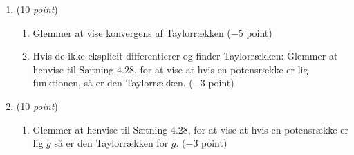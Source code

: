 \documentclass{article}
\begin{document}
\begin{opg}\hfill
	\begin{enumerate}
		\item (10 \emph{point})\begin{enumerate}[label=(\roman*)]
			\item Glemmer at vise konvergens af Taylorrækken ($ -5 $ point)
			\item Hvis de ikke eksplicit differentierer og finder Taylorrækken: Glemmer at henvise til Sætning 4.28, for at vise at hvis en potensrække er lig funktionen, så er den Taylorrækken.  ($ -3 $ point)
		\end{enumerate}
		\item (10 \emph{point})\begin{enumerate}[label=(\roman*)]
			\item Glemmer at henvise til Sætning 4.28, for at vise at hvis en potensrække er lig $ g $ så er den Taylorrækken for $ g $.  ($ -3 $ point)
		\end{enumerate}
	\end{enumerate}
\end{opg}
\end{document}
